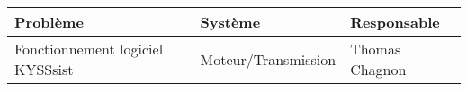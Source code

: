 \begin{tabularx}{\linewidth}{
    |>{\hsize=1.7\hsize}X|%
    >{\hsize=0.5\hsize}X|%
    >{\hsize=0.8\hsize}X|%
  }
    \hline
    \textbf{Problème} & \textbf{Système} & \textbf{Responsable} \\\hline
     Fonctionnement logiciel KYSSsist & Moteur/Transmission & Thomas Chagnon \\\hline
  \end{tabularx}
    
    
